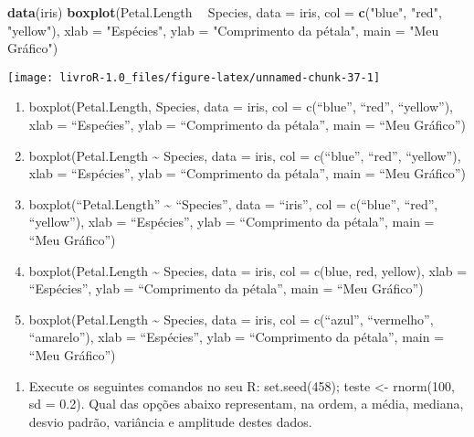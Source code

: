 \documentclass[14pt,titlepage, oneside, openany, a4paper]{book}
\newenvironment{Shaded}{\begin{snugshade}}{\end{snugshade}}
\newcommand{\DataTypeTok}[1]{\textcolor[rgb]{0.13,0.29,0.53}{#1}}
\newcommand{\KeywordTok}[1]{\textcolor[rgb]{0.13,0.29,0.53}{\textbf{#1}}}
\newcommand{\NormalTok}[1]{#1}
\newcommand{\OperatorTok}[1]{\textcolor[rgb]{0.81,0.36,0.00}{\textbf{#1}}}
\newcommand{\StringTok}[1]{\textcolor[rgb]{0.31,0.60,0.02}{#1}}
\providecommand{\tightlist}{%
  \setlength{\itemsep}{0pt}\setlength{\parskip}{0pt}}
\begin{document}
\begin{Shaded}
\begin{Highlighting}[]
\KeywordTok{data}\NormalTok{(iris)}
\KeywordTok{boxplot}\NormalTok{(Petal.Length }\OperatorTok{~}\StringTok{ }\NormalTok{Species, }\DataTypeTok{data =}\NormalTok{ iris,}
        \DataTypeTok{col =} \KeywordTok{c}\NormalTok{(}\StringTok{"blue"}\NormalTok{, }\StringTok{"red"}\NormalTok{, }\StringTok{"yellow"}\NormalTok{),}
        \DataTypeTok{xlab =} \StringTok{"Espécies"}\NormalTok{,}
        \DataTypeTok{ylab =} \StringTok{"Comprimento da pétala"}\NormalTok{,}
        \DataTypeTok{main =} \StringTok{"Meu Gráfico"}\NormalTok{)}
\end{Highlighting}
\end{Shaded}

\begin{center}\texttt{[image: livroR-1.0\_files/figure-latex/unnamed-chunk-37-1]} \end{center}

\begin{enumerate}
\def\labelenumi{(\alph{enumi})}
\tightlist
\item
  boxplot(Petal.Length,
  Species,
  data = iris,
  col = c(``blue'', ``red'', ``yellow''),
  xlab = ``Espećies'',
  ylab = ``Comprimento da pétala'',
  main = ``Meu Gráfico'')
\item
  boxplot(Petal.Length \textasciitilde{} Species,
  data = iris,
  col = c(``blue'', ``red'', ``yellow''),
  xlab = ``Espécies'',
  ylab = ``Comprimento da pétala'',
  main = ``Meu Gráfico'')
\item
  boxplot(``Petal.Length'' \textasciitilde{} ``Species'',
  data = ``iris'',
  col = c(``blue'', ``red'', ``yellow''),
  xlab = ``Espécies'',
  ylab = ``Comprimento da pétala'',
  main = ``Meu Gráfico'')
\item
  boxplot(Petal.Length \textasciitilde{} Species,
  data = iris,
  col = c(blue, red, yellow),
  xlab = ``Espécies'',
  ylab = ``Comprimento da pétala'',
  main = ``Meu Gráfico'')
\item
  boxplot(Petal.Length \textasciitilde{} Species,
  data = iris,
  col = c(``azul'', ``vermelho'', ``amarelo''),
  xlab = ``Espécies'',
  ylab = ``Comprimento da pétala'',
  main = ``Meu Gráfico'')
\end{enumerate}

\begin{enumerate}
\def\labelenumi{\arabic{enumi})}
\setcounter{enumi}{4}
\tightlist
\item
  Execute os seguintes comandos no seu R: set.seed(458); teste \textless{}- rnorm(100, sd = 0.2). Qual das opções abaixo representam, na ordem, a média, mediana, desvio padrão, variância e amplitude destes dados.
\end{enumerate}
\end{document}
